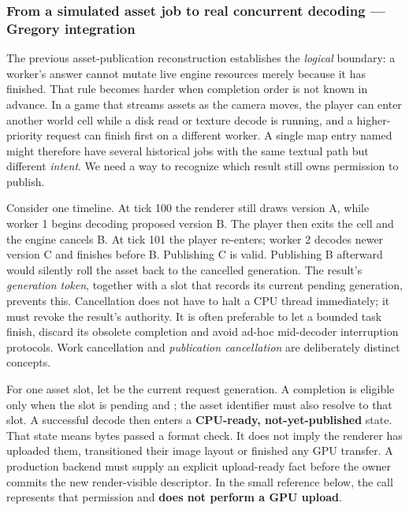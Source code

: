 \subsubsection{From a simulated asset job to real concurrent decoding --- Gregory integration}\label{06-engine-ii-ch027-from-a-simulated-asset-job-to-real-concurrent-decoding-gregory-integration}

\hypertarget{06-engine-ii-ch027-from-a-simulated-asset-job-to-real-concurrent-decoding-gregory-integration}{}

The previous asset-publication reconstruction establishes the \emph{logical} boundary: a worker's answer cannot mutate live engine resources merely because it has finished. That rule becomes harder when completion order is not known in advance. In a game that streams assets as the camera moves, the player can enter another world cell while a disk read or texture decode is running, and a higher-priority request can finish first on a different worker. A single map entry named  might therefore have several historical jobs with the same textual path but different \emph{intent}. We need a way to recognize which result still owns permission to publish.

Consider one timeline. At tick 100 the renderer still draws version A, while worker 1 begins decoding proposed version B. The player then exits the cell and the engine cancels B. At tick 101 the player re-enters; worker 2 decodes newer version C and finishes before B. Publishing C is valid. Publishing B afterward would silently roll the asset back to the cancelled generation. The result's \emph{generation token}, together with a slot that records its current pending generation, prevents this. Cancellation does not have to halt a CPU thread immediately; it must revoke the result's authority. It is often preferable to let a bounded task finish, discard its obsolete completion and avoid ad-hoc mid-decoder interruption protocols. Work cancellation and \emph{publication cancellation} are deliberately distinct concepts.

For one asset slot, let  be the current request generation. A completion  is eligible only when the slot is pending and ; the asset identifier must also resolve to that slot. A successful decode then enters a \textbf{CPU-ready, not-yet-published} state. That state means bytes passed a format check. It does not imply the renderer has uploaded them, transitioned their image layout or finished any GPU transfer. A production backend must supply an explicit upload-ready fact before the owner commits the new render-visible descriptor. In the small reference below, the  call represents that permission and \textbf{does not perform a GPU upload}.

